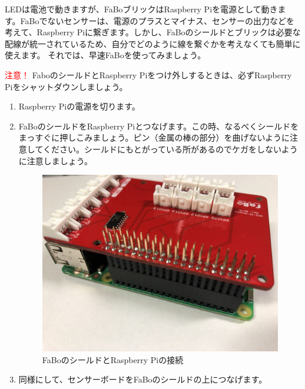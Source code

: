 LEDは電池で動きますが、FaBoブリックはRaspberry Piを電源として動きます。FaBoでないセンサーは、電源のプラスとマイナス、センサーの出力などを考えて、Raspberry Piに繋ぎます。しかし、FaBoのシールドとブリックは必要な配線が統一されているため、自分でどのように線を繋ぐかを考えなくても簡単に使えます。
それでは、早速FaBoを使ってみましょう。

\begin{itembox}[c]{\Large\textcolor{red}{注意！}}
FaboのシールドとRaspberry Piをつけ外しするときは、必ずRaspberry Piをシャットダウンしましょう。
\end{itembox}

\begin{enumerate}
\item Raspberry Piの電源を切ります。\\
\item FaBoのシールドをRaspberry Piとつなげます。この時、なるべくシールドをまっすぐに押しこみましょう。ピン（金属の棒の部分）を曲げないように注意してください。シールドにもとがっている所があるのでケガをしないように注意しましょう。\\
\begin{figure}[H]
 \centering
 \includegraphics[width=\hsize/2]{images/chap05/text05-img006.jpg}
 \caption{FaBoのシールドとRaspberry Piの接続}
\end{figure}
\item 同様にして、センサーボードをFaBoのシールドの上につなげます。\\
\begin{figure}[H]
 \centering

\end{figure}
\end{enumerate}
